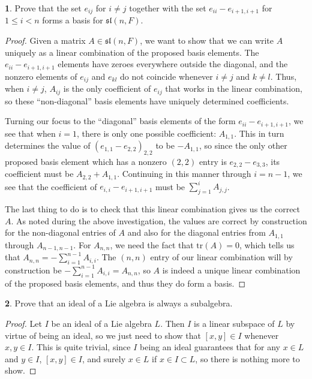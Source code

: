\documentclass[12pt]{article}
\renewcommand{\sl}{\mathfrak{sl}}
\theoremstyle{definition}
\newtheorem{ex}{}
\begin{document}
\begin{ex}
	Prove that the set $e_{ij}$ for $i \neq j$ together with the set $e_{ii} - e_{i+1,i+1}$ for $1 \leq i < n$ forms a basis for $\sl(n, F)$.
\end{ex}
\begin{proof}
	Given a matrix $A \in \sl(n, F)$, we want to show that we can write $A$ uniquely as a linear combination of the proposed basis elements.
	The $e_{ii} - e_{i+1,i+1}$ elements have zeroes everywhere outside the diagonal, and the nonzero elements of $e_{ij}$ and $e_{kl}$ do not coincide whenever $i \neq j$ and $k \neq l$.
	Thus, when $i \neq j$, $A_{ij}$ is the only coefficient of $e_{ij}$ that works in the linear combination, so these ``non-diagonal'' basis elements have uniquely determined coefficients.

	Turning our focus to the ``diagonal'' basis elements of the form $e_{ii} - e_{i+1,i+1}$, we see that when $i = 1$, there is only one possible coefficient: $A_{1, 1}$.
	This in turn determines the value of $(e_{1,1} - e_{2, 2})_{2, 2}$ to be $-A_{1,1}$, so since the only other proposed basis element which has a nonzero $(2, 2)$ entry is $e_{2,2} - e_{3, 3}$, its coefficient must be $A_{2, 2} + A_{1, 1}$.
	Continuing in this manner through $i = n - 1$, we see that the coefficient of $e_{i,i} - e_{i+1,i+1}$ must be $\sum_{j=1}^{i} A_{j,j}$.

	The last thing to do is to check that this linear combination gives us the correct $A$.
	As noted during the above investigation, the values are correct by construction for the non-diagonal entries of $A$ and also for the diagonal entries from $A_{1, 1}$ through $A_{n-1,n-1}$.
	For $A_{n,n}$, we need the fact that $\mathrm{tr}(A) = 0$, which tells us that $A_{n,n} = -\sum_{i=1}^{n-1} A_{i,i}$.
	The $(n,n)$ entry of our linear combination will by construction be $-\sum_{i=1}^{n-1} A_{i,i} = A_{n,n}$, so $A$ is indeed a unique linear combination of the proposed basis elements, and thus they do form a basis.
\end{proof}

\begin{ex}
	Prove that an ideal of a Lie algebra is always a subalgebra.
\end{ex}
\begin{proof}
	Let $I$ be an ideal of a Lie algebra $L$.
	Then $I$ is a linear subspace of $L$ by virtue of being an ideal, so we just need to show that $[x, y] \in I$ whenever $x, y \in I$.
	This is quite trivial, since $I$ being an ideal guarantees that for any $x \in L$ and $y \in I$, $[x, y] \in I$, and surely $x \in L$ if $x \in I \subset L$, so there is nothing more to show.
\end{proof}
\end{document}
